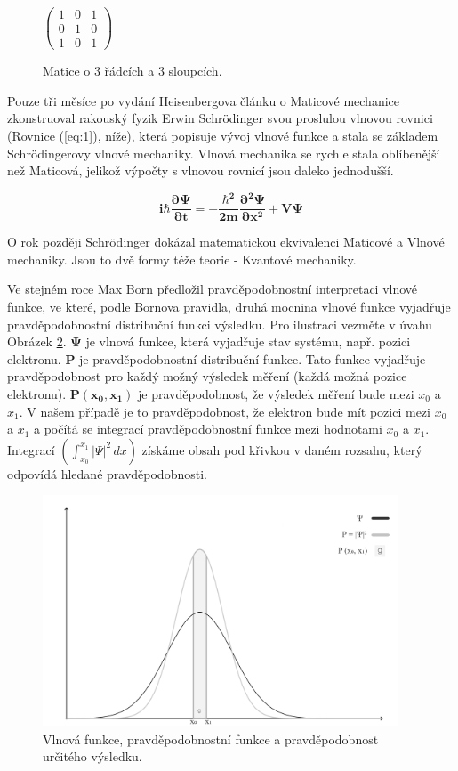 \begin{figure}[ht]
    \centering
    $\begin{pmatrix}
    1 & 0 & 1 \\
    0 & 1 & 0 \\
    1 & 0 & 1
    \end{pmatrix}
    $
    \caption{\label{fig:1}Matice o 3 řádcích a 3 sloupcích.}
\end{figure}

Pouze tři měsíce po vydání Heisenbergova článku o Maticové mechanice zkonstruoval rakouský fyzik Erwin Schrödinger svou proslulou vlnovou rovnici (Rovnice (\ref{eq:1}), níže), která popisuje vývoj vlnové funkce a stala se základem Schrödingerovy vlnové mechaniky. Vlnová mechanika se rychle stala oblíbenější než Maticová, jelikož výpočty s vlnovou rovnicí jsou daleko jednodušší.

\begin{equation}
    \bm{i\hbar \frac{\partial \Psi}{\partial t} = -\frac{\hbar^2}{2m}
    \frac{\partial^2 \Psi}{\partial x^2} + V \Psi}
    \label{eq:1}
\end{equation}

O rok později Schrödinger dokázal matematickou ekvivalenci Maticové a Vlnové mechaniky. Jsou to dvě formy téže teorie - Kvantové mechaniky.

Ve stejném roce Max Born předložil pravděpodobnostní interpretaci vlnové funkce, ve které, podle Bornova pravidla, druhá mocnina vlnové funkce vyjadřuje pravděpodobnostní distribuční funkci výsledku. Pro ilustraci vezměte v úvahu Obrázek \ref{fig:2}. $\bm{\Psi}$ je vlnová funkce, která vyjadřuje stav systému, např. pozici elektronu. \textbf{P} je pravděpodobnostní distribuční funkce. Tato funkce vyjadřuje pravděpodobnost pro každý možný výsledek měření (každá možná pozice elektronu). $\bm{P(x_0,x_1)}$ je pravděpodobnost, že výsledek měření bude mezi $x_0$ a $x_1$. V našem případě je to pravděpodobnost, že elektron bude mít pozici mezi $x_0$ a $x_1$ a počítá se integrací pravděpodobnost\-ní funkce mezi hodnotami $x_0$ a $x_1$. Integrací $(\int_{x_0}^{x_1}|\Psi|^2\,dx)$ získáme obsah pod křivkou v daném rozsahu, který odpovídá hledané pravděpodobnosti. 




\begin{figure}[ht]
\centering
\includegraphics[width=300pt]{images/probability-function.png}
\caption{\label{fig:2}Vlnová funkce, pravděpodobnostní funkce a pravděpodobnost určitého výsledku.}
\end{figure}

